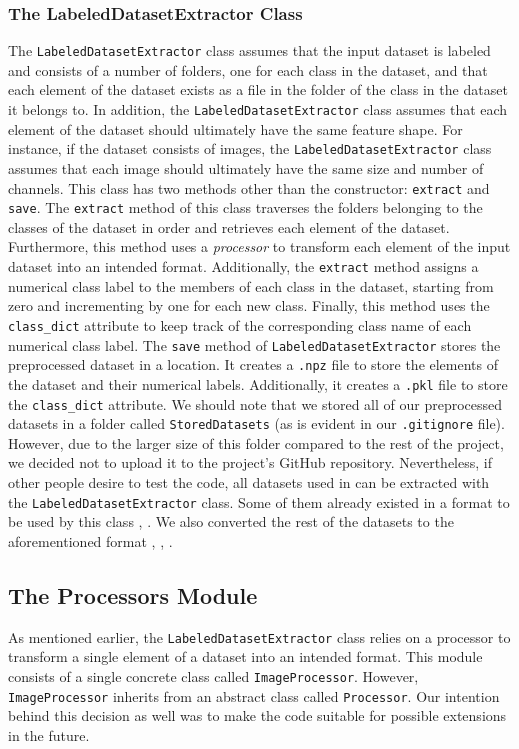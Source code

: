 \documentclass[14pt]{extarticle}
\begin{document}
		\subsubsection{The LabeledDatasetExtractor Class}
		The \texttt{LabeledDatasetExtractor} class assumes that the input dataset is labeled and consists of a number of folders, one for each class in the dataset, and that each element of the dataset exists as a file in the folder of the class in the dataset it belongs to. In addition, the \texttt{LabeledDatasetExtractor} class assumes that each element of the dataset should ultimately have the same feature shape. For instance, if the dataset consists of images, the \texttt{LabeledDatasetExtractor} class assumes that each image should ultimately have the same size and number of channels. This class has two methods other than the constructor: \texttt{extract} and \texttt{save}. The \texttt{extract} method of this class traverses the folders belonging to the classes of the dataset in order and retrieves each element of the dataset. Furthermore, this method uses a \textit{processor} to transform each element of the input dataset into an intended format. Additionally, the \texttt{extract} method assigns a numerical class label to the members of each class in the dataset, starting from zero and incrementing by one for each new class. Finally, this method uses the \texttt{class\_dict} attribute to keep track of the corresponding class name of each numerical class label. The \texttt{save} method of \texttt{LabeledDatasetExtractor} stores the preprocessed dataset in a location. It creates a \texttt{.npz} file to store the elements of the dataset and their numerical labels. Additionally, it creates a \texttt{.pkl} file to store the \texttt{class\_dict} attribute. We should note that we stored all of our preprocessed datasets in a folder called \texttt{StoredDatasets} (as is evident in our \texttt{.gitignore} file). However, due to the larger size of this folder compared to the rest of the project, we decided not to upload it to the project's GitHub repository. Nevertheless, if other people desire to test the code, all datasets used in \cite{adda} can be extracted with the \texttt{LabeledDatasetExtractor} class. Some of them already existed in a format to be used by this class \cite{mnistjpg}, \cite{officepwc}. We also converted the rest of the datasets to the aforementioned format \cite{uspsjpg}, \cite{svhnjpg}, \cite{nyud2jpg}.
		\subsection{The Processors Module}
		As mentioned earlier, the \texttt{LabeledDatasetExtractor} class relies on a processor to transform a single element of a dataset into an intended format. This module consists of a single concrete class called \texttt{ImageProcessor}. However, \texttt{ImageProcessor} inherits from an abstract class called \texttt{Processor}. Our intention behind this decision as well was to make the code suitable for possible extensions in the future.
\end{document}
